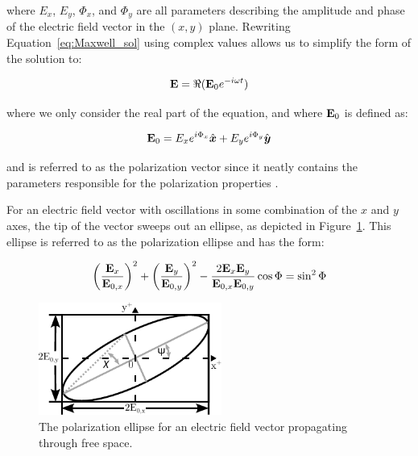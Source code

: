 \noindent where $E_{x}$, $E_{y}$, $\Phi_{x}$, and $\Phi_{y}$ are all parameters describing the amplitude and phase of the electric field vector in the $(x, y)$ plane. Rewriting Equation~\ref{eq:Maxwell_sol} using complex values allows us to simplify the form of the solution to:

\begin{equation}
    \mathbf{E} = \Re(\mathbf{E}_{0} e^{-i \omega t})
    \label{eq:E_field_vector}
\end{equation}

\noindent where we only consider the real part of the equation, and where $\mathbf{E}_{0}$ is defined as:

\begin{equation}
    \mathbf{E}_{0} = E_{x} e^{i \Phi_{x}} \hat{\boldsymbol{x}} +
    E_{y} e^{i \Phi_{y}} \hat{\boldsymbol{y}}
    \label{eq:pol_vector}
\end{equation}

\noindent and is referred to as the polarization vector since it neatly contains the parameters responsible for the polarization properties \citep{pol_phys}.
\prgph

For an electric field vector with oscillations in some combination of the $x$ and $y$ axes, the tip of the vector sweeps out an ellipse, as depicted in Figure~\ref{fig:pol_ellipse}. This ellipse is referred to as the polarization ellipse and has the form:

\begin{equation}
    \left( \frac{\mathbf{E}_{x}}{\mathbf{E}_{0, x}}\right)^{2} +
    \left( \frac{\mathbf{E}_{y}}{\mathbf{E}_{0, y}}\right)^{2} -
    \frac{2 \mathbf{E}_{x} \mathbf{E}_{y}}{\mathbf{E}_{0, x} \mathbf{E}_{0, y}} \cos\Phi =
    \sin^{2} \Phi
    \label{eq:pol_ellipse}
\end{equation}

\begin{figure}[t]
    \centering
    \includegraphics[width=6cm]{figures/2_pol_ellipse.pdf}
    \caption{The polarization ellipse for an electric field vector propagating through free space.}
    \label{fig:pol_ellipse}
\end{figure}

